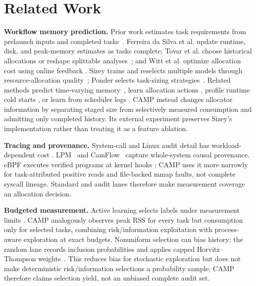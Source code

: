 \section{Related Work}
\label{sec:related}

\textbf{Workflow memory prediction.}
Prior work estimates task requirements from prelaunch inputs and completed
tasks~\cite{bader2025overview}. Ferreira da Silva et al.
\cite{dasilva2013online,dasilva2015online} update runtime, disk, and peak-memory
estimates as tasks complete; Tovar et al. choose historical allocations or
reshape splittable analyses~\cite{tovar2018jobsizing,tovar2022shaping}; and Witt
et al. optimize allocation cost using online feedback
\cite{witt2019feedback,witt2019icecube}. Sizey trains and reselects multiple
models through resource-allocation quality~\cite{bader2024sizey}; Ponder selects
task-sizing strategies~\cite{lehmann2024ponder}. Related methods predict
time-varying memory~\cite{bader2023dynamic}, learn allocation actions
\cite{bader2022reinforcement}, profile runtime cold starts
\cite{bader2024lotaru}, or learn from scheduler logs
\cite{rodrigues2016helping,tanash2019slurm}. CAMP instead changes allocator
information by separating staged size from selectively measured consumption
and admitting only completed history. Its external experiment preserves
Sizey's implementation rather than treating it as a feature ablation.

\textbf{Tracing and provenance.}
System-call and Linux audit detail has workload-dependent cost
\cite{zeng2016linux}. LPM~\cite{bates2015trustworthy} and
CamFlow~\cite{pasquier2017practical} capture whole-system causal provenance.
eBPF executes verified programs at kernel hooks
\cite{gbadamosi2024ebpf}; CAMP uses it more narrowly for
task-attributed positive reads and file-backed mmap faults, not complete syscall
lineage. Standard and audit lanes therefore make measurement coverage an
allocation decision.

\textbf{Budgeted measurement.}
Active learning selects labels under measurement limits
\cite{settles2009active}. CAMP analogously observes peak RSS for every task but
consumption only for selected tasks, combining risk/information exploitation
with process-aware exploration at exact budgets. Nonuniform selection can bias
history: the random lane records inclusion probabilities and applies capped
Horvitz--Thompson weights~\cite{horvitz1952generalization}. This reduces bias
for stochastic exploration but does not make deterministic risk/information
selections a probability sample; CAMP therefore claims selection yield, not an
unbiased complete audit set.
